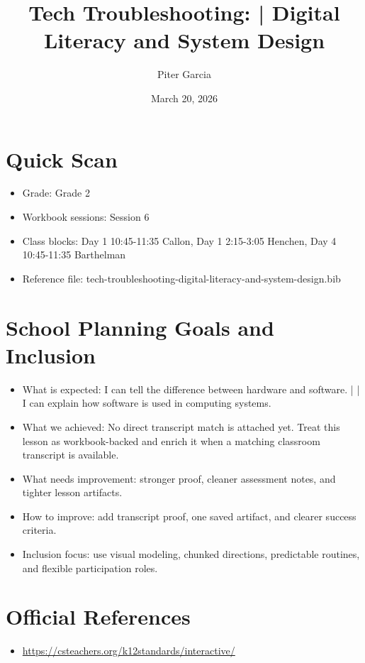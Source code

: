 \documentclass[11pt]{article}
\title{Tech Troubleshooting: | Digital Literacy and System Design}
\author{Piter Garcia}
\date{March 20, 2026}
\begin{document}
\maketitle
\section*{Quick Scan}
\begin{itemize}[leftmargin=*]
\item Grade: Grade 2
\item Workbook sessions: Session 6
\item Class blocks: Day 1 10:45-11:35 Callon, Day 1 2:15-3:05 Henchen, Day 4 10:45-11:35 Barthelman
\item Reference file: tech-troubleshooting-digital-literacy-and-system-design.bib
\end{itemize}
\section*{School Planning Goals and Inclusion}
\begin{itemize}[leftmargin=*]
\item What is expected: I can tell the difference between hardware and software. | | I can explain how software is used in computing systems.
\item What we achieved: No direct transcript match is attached yet. Treat this lesson as workbook-backed and enrich it when a matching classroom transcript is available.
\item What needs improvement: stronger proof, cleaner assessment notes, and tighter lesson artifacts.
\item How to improve: add transcript proof, one saved artifact, and clearer success criteria.
\item Inclusion focus: use visual modeling, chunked directions, predictable routines, and flexible participation roles.
\end{itemize}
\section*{Official References}
\begin{itemize}[leftmargin=*]
\item \url{https://csteachers.org/k12standards/interactive/}

\end{itemize}
\end{document}
